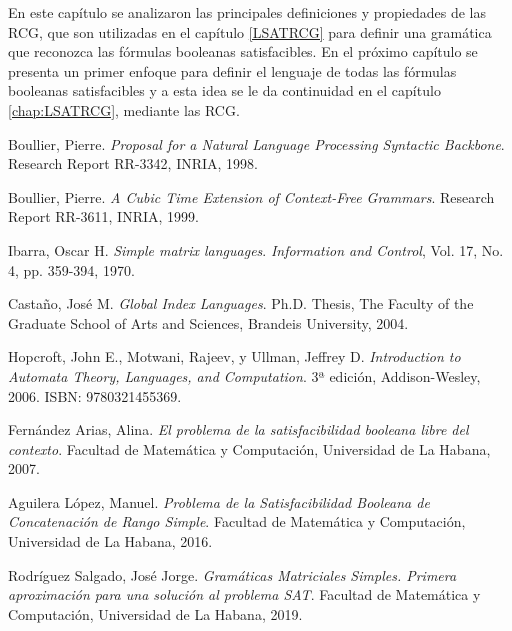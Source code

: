 \documentclass[12pt]{article}
\begin{document}
En este capítulo se analizaron las principales definiciones y propiedades de las RCG, que son utilizadas
en el capítulo \ref{LSATRCG} para definir una gramática que reconozca las fórmulas booleanas satisfacibles.
En el próximo capítulo se presenta un primer enfoque para definir el lenguaje de todas las fórmulas booleanas
satisfacibles y a esta idea se le da continuidad en el capítulo \ref{chap:LSATRCG}, mediante las RCG.

\begin{thebibliography}{99}

    Boullier, Pierre.
    \textit{Proposal for a Natural Language Processing Syntactic Backbone}.
    Research Report RR-3342, INRIA, 1998.

    Boullier, Pierre.
    \textit{A Cubic Time Extension of Context-Free Grammars}.
    Research Report RR-3611, INRIA, 1999.

    Ibarra, Oscar H.
    \textit{Simple matrix languages}.
    \textit{Information and Control}, Vol. 17, No. 4, pp. 359-394, 1970.

    Castaño, José M.
    \textit{Global Index Languages}.
    Ph.D. Thesis, The Faculty of the Graduate School of Arts and Sciences, Brandeis University, 2004.

    Hopcroft, John E., Motwani, Rajeev, y Ullman, Jeffrey D.
    \textit{Introduction to Automata Theory, Languages, and Computation}.
    3ª edición, Addison-Wesley, 2006. ISBN: 9780321455369.

    Fernández Arias, Alina.
    \textit{El problema de la satisfacibilidad booleana libre del contexto}.
    Facultad de Matemática y Computación, Universidad de La Habana, 2007.

    Aguilera López, Manuel.
    \textit{Problema de la Satisfacibilidad Booleana de Concatenación de Rango Simple}.
    Facultad de Matemática y Computación, Universidad de La Habana, 2016.

    Rodríguez Salgado, José Jorge.
    \textit{Gramáticas Matriciales Simples. Primera aproximación para una solución al problema SAT}.
    Facultad de Matemática y Computación, Universidad de La Habana, 2019.

\end{thebibliography}
\end{document}
